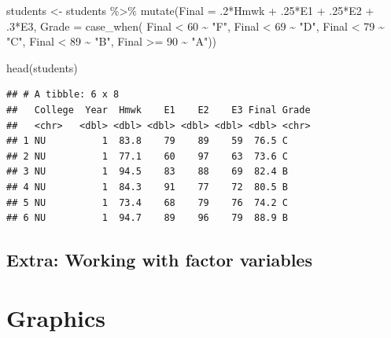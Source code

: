 \documentclass[
]{book}
\newenvironment{Shaded}{\begin{snugshade}}{\end{snugshade}}
\newcommand{\AttributeTok}[1]{\textcolor[rgb]{0.77,0.63,0.00}{#1}}
\newcommand{\DecValTok}[1]{\textcolor[rgb]{0.00,0.00,0.81}{#1}}
\newcommand{\FunctionTok}[1]{\textcolor[rgb]{0.00,0.00,0.00}{#1}}
\newcommand{\NormalTok}[1]{#1}
\newcommand{\OtherTok}[1]{\textcolor[rgb]{0.56,0.35,0.01}{#1}}
\newcommand{\SpecialCharTok}[1]{\textcolor[rgb]{0.00,0.00,0.00}{#1}}
\newcommand{\StringTok}[1]{\textcolor[rgb]{0.31,0.60,0.02}{#1}}
\begin{document}
\begin{Shaded}
\begin{Highlighting}[]
\NormalTok{students }\OtherTok{\textless{}{-}}\NormalTok{ students }\SpecialCharTok{\%\textgreater{}\%} 
  \FunctionTok{mutate}\NormalTok{(}\AttributeTok{Final =}\NormalTok{ .}\DecValTok{2}\SpecialCharTok{*}\NormalTok{Hmwk }\SpecialCharTok{+}\NormalTok{ .}\DecValTok{25}\SpecialCharTok{*}\NormalTok{E1 }\SpecialCharTok{+}\NormalTok{ .}\DecValTok{25}\SpecialCharTok{*}\NormalTok{E2 }\SpecialCharTok{+}\NormalTok{ .}\DecValTok{3}\SpecialCharTok{*}\NormalTok{E3,}
         \AttributeTok{Grade =} \FunctionTok{case\_when}\NormalTok{(}
\NormalTok{           Final }\SpecialCharTok{\textless{}} \DecValTok{60} \SpecialCharTok{\textasciitilde{}} \StringTok{"F"}\NormalTok{,}
\NormalTok{           Final }\SpecialCharTok{\textless{}} \DecValTok{69} \SpecialCharTok{\textasciitilde{}} \StringTok{"D"}\NormalTok{,}
\NormalTok{           Final }\SpecialCharTok{\textless{}} \DecValTok{79} \SpecialCharTok{\textasciitilde{}} \StringTok{"C"}\NormalTok{,}
\NormalTok{           Final }\SpecialCharTok{\textless{}} \DecValTok{89} \SpecialCharTok{\textasciitilde{}} \StringTok{"B"}\NormalTok{,}
\NormalTok{           Final }\SpecialCharTok{\textgreater{}=} \DecValTok{90} \SpecialCharTok{\textasciitilde{}} \StringTok{"A"}\NormalTok{))}

\FunctionTok{head}\NormalTok{(students)}
\end{Highlighting}
\end{Shaded}

\begin{verbatim}
## # A tibble: 6 x 8
##   College  Year  Hmwk    E1    E2    E3 Final Grade
##   <chr>   <dbl> <dbl> <dbl> <dbl> <dbl> <dbl> <chr>
## 1 NU          1  83.8    79    89    59  76.5 C    
## 2 NU          1  77.1    60    97    63  73.6 C    
## 3 NU          1  94.5    83    88    69  82.4 B    
## 4 NU          1  84.3    91    77    72  80.5 B    
## 5 NU          1  73.4    68    79    76  74.2 C    
## 6 NU          1  94.7    89    96    79  88.9 B
\end{verbatim}

\hypertarget{extra-working-with-factor-variables}{%
\section{Extra: Working with factor variables}\label{extra-working-with-factor-variables}}

\hypertarget{graphics}{%
\chapter{Graphics}\label{graphics}}
\end{document}
